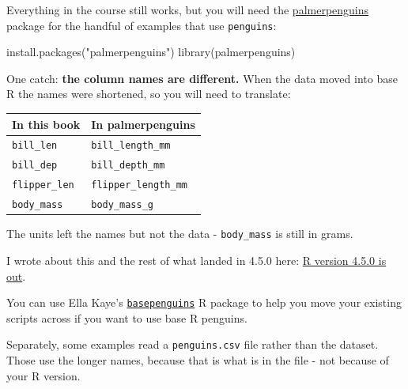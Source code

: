 \documentclass[
  letterpaper,
  justified,
  a4paper]{tufte-book}
\makeatletter
\newenvironment{Shaded}{\begin{snugshade}}{\end{snugshade}}
\newcommand{\FunctionTok}[1]{\textcolor[rgb]{0.28,0.35,0.67}{#1}}
\newcommand{\NormalTok}[1]{\textcolor[rgb]{0.00,0.23,0.31}{#1}}
\newcommand{\StringTok}[1]{\textcolor[rgb]{0.13,0.47,0.30}{#1}}
\newcounter{none} %
\let\rbporigShaded\Shaded
\let\rbporigendShaded\endShaded
\renewenvironment{Shaded}{%
  \begingroup
  \ifdim\linewidth=\rbpbodywidth
    \advance\linewidth by \@tufte@overhang
    \advance\hsize by \@tufte@overhang
    \advance\columnwidth by \@tufte@overhang
  \fi
  \rbporigShaded
}{%
  \rbporigendShaded
  \endgroup
}
\makeatother
\begin{document}
\begin{tcolorbox}[enhanced jigsaw, arc=.35mm, bottomrule=.15mm, bottomtitle=1mm, breakable, colback=white, colbacktitle=quarto-callout-tip-color!10!white, colframe=quarto-callout-tip-color-frame, coltitle=black, left=2mm, leftrule=.75mm, opacityback=0, opacitybacktitle=0.6, rightrule=.15mm, title=\textcolor{quarto-callout-tip-color}{\faLightbulb}\hspace{0.5em}{If you are on an older R}, titlerule=0mm, toprule=.15mm, toptitle=1mm]

Everything in the course still works, but you will need the
\href{https://allisonhorst.github.io/palmerpenguins/}{palmerpenguins}
package for the handful of examples that use \texttt{penguins}:

\begin{Shaded}
\begin{Highlighting}[]
\FunctionTok{install.packages}\NormalTok{(}\StringTok{"palmerpenguins"}\NormalTok{)}
\FunctionTok{library}\NormalTok{(palmerpenguins)}
\end{Highlighting}
\end{Shaded}

One catch: \textbf{the column names are different.} When the data moved
into base R the names were shortened, so you will need to translate:

{\def\LTcaptype{none} %
\begin{longtable}[]{@{}ll@{}}
\toprule\noalign{}
In this book & In palmerpenguins \\
\midrule\noalign{}
\endhead
\bottomrule\noalign{}
\endlastfoot
\texttt{bill\_len} & \texttt{bill\_length\_mm} \\
\texttt{bill\_dep} & \texttt{bill\_depth\_mm} \\
\texttt{flipper\_len} & \texttt{flipper\_length\_mm} \\
\texttt{body\_mass} & \texttt{body\_mass\_g} \\
\end{longtable}
}

The units left the names but not the data - \texttt{body\_mass} is still
in grams.

I wrote about this and the rest of what landed in 4.5.0 here:
\href{https://www.njtierney.com/posts/2025-04-14-r-version-4-5-0-is-out/}{R
version 4.5.0 is out}.

You can use Ella Kaye's
\href{https://ellakaye.github.io/basepenguins/}{\texttt{basepenguins}} R
package to help you move your existing scripts across if you want to use
base R penguins.

Separately, some examples read a \texttt{penguins.csv} file rather than
the dataset. Those use the longer names, because that is what is in the
file - not because of your R version.

\end{tcolorbox}
\end{document}
